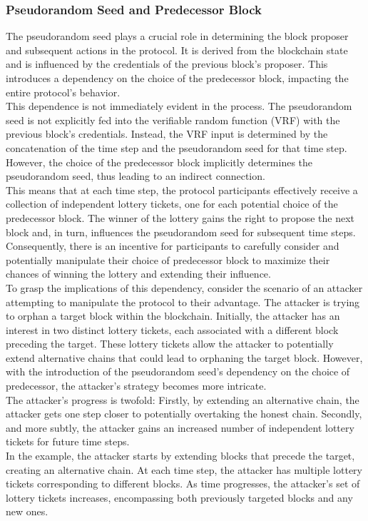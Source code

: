 \subsubsection{Pseudorandom Seed and Predecessor Block}
The pseudorandom seed plays a crucial role in determining the block proposer and subsequent actions in the protocol. It is derived from the blockchain state and is influenced by the credentials of the previous block's proposer. This introduces a dependency on the choice of the predecessor block, impacting the entire protocol's behavior.\\
This dependence is not immediately evident in the process. The pseudorandom seed is not explicitly fed into the verifiable random function (VRF) with the previous block's credentials. Instead, the VRF input is determined by the concatenation of the time step and the pseudorandom seed for that time step. However, the choice of the predecessor block implicitly determines the pseudorandom seed, thus leading to an indirect connection.\\
This means that at each time step, the protocol participants effectively receive a collection of independent lottery tickets, one for each potential choice of the predecessor block. The winner of the lottery gains the right to propose the next block and, in turn, influences the pseudorandom seed for subsequent time steps. Consequently, there is an incentive for participants to carefully consider and potentially manipulate their choice of predecessor block to maximize their chances of winning the lottery and extending their influence.\\
To grasp the implications of this dependency, consider the scenario of an attacker attempting to manipulate the protocol to their advantage. The attacker is trying to orphan a target block within the blockchain. Initially, the attacker has an interest in two distinct lottery tickets, each associated with a different block preceding the target. These lottery tickets allow the attacker to potentially extend alternative chains that could lead to orphaning the target block. However, with the introduction of the pseudorandom seed's dependency on the choice of predecessor, the attacker's strategy becomes more intricate.\\
The attacker's progress is twofold: Firstly, by extending an alternative chain, the attacker gets one step closer to potentially overtaking the honest chain. Secondly, and more subtly, the attacker gains an increased number of independent lottery tickets for future time steps.\\
In the example, the attacker starts by extending blocks that precede the target, creating an alternative chain. At each time step, the attacker has multiple lottery tickets corresponding to different blocks. As time progresses, the attacker's set of lottery tickets increases, encompassing both previously targeted blocks and any new ones.

